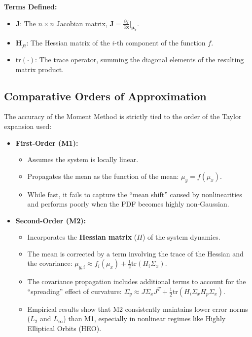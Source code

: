 \documentclass[
  letterpaper,
  DIV=11,
  numbers=noendperiod,
  oneside]{scrartcl}
\begin{document}
\textbf{Terms Defined:}

\begin{itemize}
\item
  \(\mathbf{J}\): The \(n \times n\) Jacobian matrix,
  \(\mathbf{J} = \frac{\partial f}{\partial \mathbf{x}}\big|_{\boldsymbol{\mu}_x}\).
\item
  \(\mathbf{H}_{fi}\): The Hessian matrix of the \(i\)-th component of
  the function \(f\).
\item
  \(\text{tr}(\cdot)\): The trace operator, summing the diagonal
  elements of the resulting matrix product.
\end{itemize}

\subsection{Comparative Orders of
Approximation}\label{comparative-orders-of-approximation}

The accuracy of the Moment Method is strictly tied to the order of the
Taylor expansion used:

\begin{itemize}
\item
  \textbf{First-Order (M1):}

  \begin{itemize}
  \item
    Assumes the system is locally linear.
  \item
    Propagates the mean as the function of the mean:
    \(\mu_y = f(\mu_x)\).
  \item
    While fast, it fails to capture the ``mean shift'' caused by
    nonlinearities and performs poorly when the PDF becomes highly
    non-Gaussian.
  \end{itemize}
\item
  \textbf{Second-Order (M2):}

  \begin{itemize}
  \item
    Incorporates the \textbf{Hessian matrix} (\(H\)) of the system
    dynamics.
  \item
    The mean is corrected by a term involving the trace of the Hessian
    and the covariance:
    \(\mu_{y,i} \approx f_i(\mu_x) + \frac{1}{2} \text{tr}(H_i \Sigma_x)\).
  \item
    The covariance propagation includes additional terms to account for
    the ``spreading'' effect of curvature:
    \(\Sigma_y \approx J \Sigma_x J^T + \frac{1}{2} \text{tr}(H_i \Sigma_x H_p \Sigma_x)\).
  \item
    Empirical results show that M2 consistently maintains lower error
    norms (\(L_2\) and \(L_\infty\)) than M1, especially in nonlinear
    regimes like Highly Elliptical Orbits (HEO).
  \end{itemize}
\end{itemize}
\end{document}
